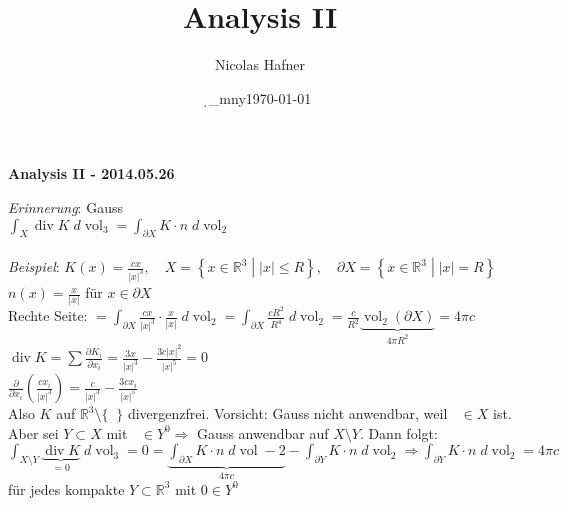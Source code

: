 \documentclass[12pt,a4paper,titlepage]{article}
\author{Nicolas Hafner}
\title{Analysis II}
\date{\d_mny\today}
\renewcommand{\d}{\partial}
\newcommand{\setR}{\mathbb{R}}
\newcommand{\vol}{\operatorname{vol}}
\newcommand{\divv}{\operatorname{div}}
\newcommand{\threevec}[3]{\mathop{\left(\substack{#1 \\ #2 \\ #3}\right)}}
\begin{document}
	
\begin{center}{\bfseries\Huge Analysis II - 2014.05.26}\end{center}
\textit{Erinnerung}: Gauss \\
$\int_X\divv K \;d\vol_3=\int_{\d X}K\cdot n \;d\vol_2$ \\
\\
\textit{Beispiel}: $K(x)=\frac{cx}{|x|^3},\quad X=\left\{x\in\setR^3\middle||x|\leq R\right\},\quad \d X=\left\{x\in\setR^3\middle||x|= R\right\}$ \\
$n(x)=\frac{x}{|x|}$ für $x\in\d X$ \\
Rechte Seite: $=\int_{\d X}\frac{cx}{|x|^3}\cdot\frac{x}{|x|} \;d\vol_2 = \int_{\d X}\frac{cR^2}{R^4} \;d\vol_2 = \frac{c}{R^2}\underbrace{\vol_2(\d X)}_{4\pi R^2} = 4\pi c$ \\
$\divv K=\sum\frac{\d K_i}{\d x_i} = \frac{3x}{|x|^3}-\frac{3c|x|^2}{|x|^5}=0$ \\
$\frac{\d}{\d x_i}(\frac{cx_i}{|x|^3})=\frac{c}{|x|^3}-\frac{3cx_i}{|x|^5}$ \\
Also $K$ auf $\setR^3\setminus\{\threevec{0}{0}{0}\}$ divergenzfrei. Vorsicht: Gauss nicht anwendbar, weil $\threevec{0}{0}{0}\in X$ ist. Aber sei $Y\subset X$ mit $\threevec{0}{0}{0}\in Y^0 \Rightarrow$ Gauss anwendbar auf $X\setminus Y$. Dann folgt: \\
$\int_{X\setminus Y}\underbrace{\divv K}_{=0}\;d\vol_3=0 = \underbrace{\int_{\d X}K\cdot n\;d\vol-2}_{4\pi c}-\int_{\d Y}K\cdot n\;d\vol_2 \Rightarrow \int_{\d Y}K\cdot n\;d\vol_2=4\pi c$ \\
für jedes kompakte $Y\subset\setR^3$ mit $0\in Y^0$
\end{document}
